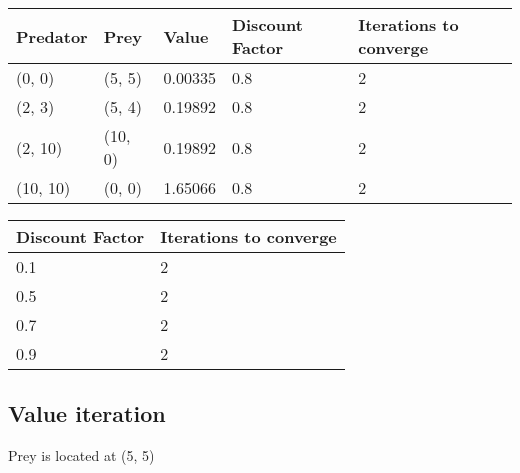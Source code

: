\documentclass{article}
\begin{document}


\begin{center}
	\begin{tabular}{ l | l | l | l | l }
		Predator & Prey & Value & Discount Factor & Iterations to converge \\ 
		\hline
		(0, 0) & (5, 5) & 0.00335 & 0.8 & 2 \\
		(2, 3) & (5, 4) & 0.19892 & 0.8 & 2 \\
		(2, 10) & (10, 0) & 0.19892 & 0.8 & 2 \\
		(10, 10) & (0, 0) & 1.65066 & 0.8 & 2 \\	
	\end{tabular}
\end{center}


\begin{center}
	\begin{tabular}{ l || l }
		Discount Factor & Iterations to converge \\ 
		\hline
		0.1 & 2 \\
		0.5 & 2 \\
		0.7 & 2 \\
		0.9 & 2 \\	
	\end{tabular}
\end{center}


\subsection*{Value iteration}


Prey is located at (5, 5)
\end{document}
